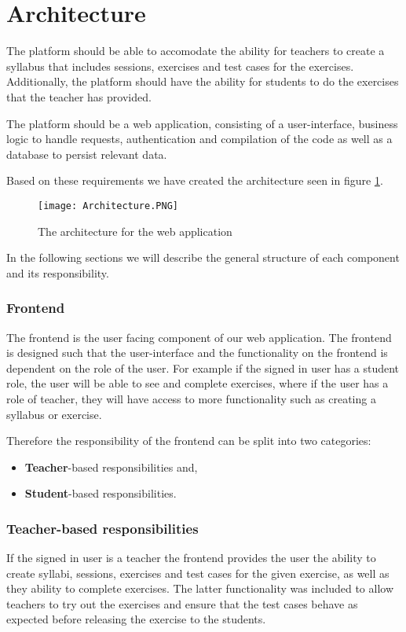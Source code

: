 \section{Architecture}
The platform should be able to accomodate the ability for teachers to create a syllabus that includes sessions, exercises and test cases for the exercises. Additionally, the platform should have the ability for students to do the exercises that the teacher has provided. 

The platform should be a web application, consisting of a user-interface, business logic to handle requests, authentication and compilation of the code as well as a database to persist relevant data.

Based on these requirements we have created the architecture seen in figure \ref{fig:Architecture}.

\begin{figure}[H]
	\texttt{[image: Architecture.PNG]}
	\centering
	\caption{The architecture for the web application}
	\label{fig:Architecture}
\end{figure}

In the following sections we will describe the general structure of each component and its responsibility.

\subsubsection{Frontend}
The frontend is the user facing component of our web application. The frontend is designed such that the user-interface and the functionality on the frontend is dependent on the role of the user. 
For example if the signed in user has a student role, the user will be able to see and complete exercises, where if the user has a role of teacher, they will have access to more functionality such as creating a syllabus or exercise.

Therefore the responsibility of the frontend can be split into two categories: 
\begin{itemize}
    \item \textbf{Teacher}-based responsibilities and,
    \item \textbf{Student}-based responsibilities.
\end{itemize}

\subsubsection*{Teacher-based responsibilities}
If the signed in user is a teacher the frontend provides the user the ability to create syllabi, sessions, exercises and test cases for the given exercise, as well as they ability to complete exercises. The latter functionality was included to allow teachers to try out the exercises and ensure that the test cases behave as expected before releasing the exercise to the students.

